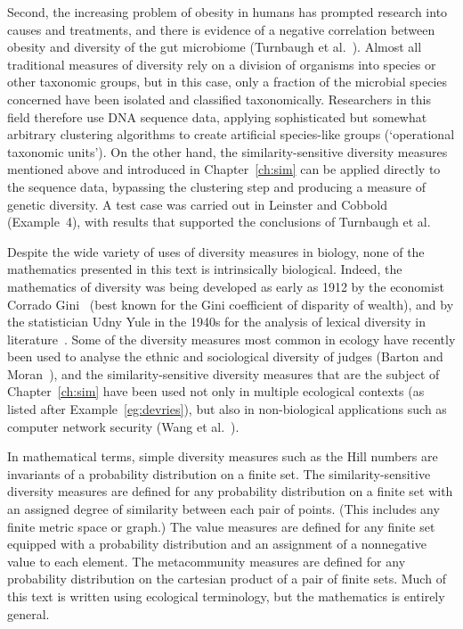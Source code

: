 Second, the increasing problem of obesity in humans has prompted research
into causes and treatments, and there is evidence of a negative
correlation between obesity and diversity of the gut%
%
% 
microbiome (Turnbaugh et al.~\cite{THYC,TQFM}).  Almost all traditional
measures of diversity rely on a division of organisms into species or other
taxonomic groups, but in this case, only a fraction of the microbial
species concerned have been isolated and classified taxonomically.
Researchers in this field therefore use DNA sequence data, applying
sophisticated but somewhat arbitrary clustering algorithms to create
artificial species-like groups (`operational taxonomic units').  On the
other hand, the similarity-sensitive diversity measures mentioned above and
introduced in Chapter~\ref{ch:sim} can be applied directly to the sequence
data, bypassing the clustering step and producing a measure of genetic
diversity.  A test case was carried out in Leinster and
Cobbold~\cite{MDISS} (Example~4), with results that supported the
conclusions of Turnbaugh et al.

Despite the wide variety of uses of diversity measures in biology, none of
the mathematics presented in this text is intrinsically biological.%
% 
% 
Indeed, the mathematics of diversity was being developed as early as 1912
by the economist Corrado
Gini~\cite{Gini}%
%
% 
(best known for the Gini
coefficient of disparity of wealth), and by the statistician Udny
Yule%
%
% 
in the 1940s for the analysis of lexical%
%
%
% 
diversity in literature~\cite{Yule}.  Some of the diversity measures most
common in ecology have recently been used to analyse the ethnic and
sociological diversity of judges (Barton and Moran~\cite{BaMo}), and the
similarity-sensitive diversity measures that are the subject of
Chapter~\ref{ch:sim} have been used not only in multiple ecological
contexts (as listed after Example~\ref{eg:devries}), but also in
non-biological applications such as computer%
%
% 
network security (Wang et al.~\cite{WZJS}).%
% 

In mathematical terms, simple diversity measures such as the Hill numbers
are invariants of a probability distribution on a finite set.  The
similarity-sensitive diversity measures are defined for any probability
distribution on a finite set with an assigned degree of similarity between
each pair of points.  (This includes any finite metric space or graph.)
The value measures are defined for any finite set equipped with a
probability distribution and an assignment of a nonnegative value to each
element.  The metacommunity measures are defined for any probability
distribution on the cartesian product of a pair of finite sets.  Much of
this text is written using ecological terminology, but the mathematics is
entirely general.

